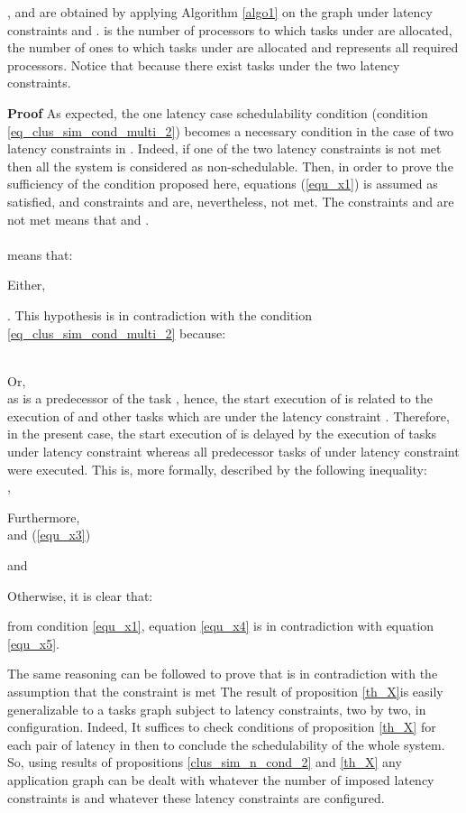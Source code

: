 \documentclass{ijcaArticle}
\begin{document}
,  and  are obtained by applying Algorithm \ref{algo1} on the graph under latency  constraints  and .  is the number of processors to which tasks under  are allocated,  the number of ones to which tasks under  are allocated and  represents all required processors. Notice that  because there exist tasks under the two latency constraints.    




\vskip2mm

\textbf{Proof} 
As expected, the one latency case schedulability condition (condition \ref{eq_clus_sim_cond_multi_2}) becomes a necessary condition in the case of two latency constraints in . Indeed, if one of the two latency constraints is not met then all the system is considered as non-schedulable.
Then, in order to prove the sufficiency of the condition proposed here, equations (\ref{equ_x1}) is assumed as satisfied, and constraints  and  are, nevertheless,  not met.  The constraints  and  are not met means that  and . 
\\\\
 means that: 


Either, 

. This hypothesis is in contradiction with the condition \ref{eq_clus_sim_cond_multi_2}  because:

     \\
\vskip1mm
Or, \\ as  is a predecessor of the task , hence, the start execution of  is related to the execution of  and other tasks which are under the latency constraint . Therefore,  in the present case, the start execution of  is delayed by the execution   
of tasks under latency constraint  whereas all predecessor tasks of  under latency constraint  were executed. This is, more formally, described by the following inequality: \\ 
, 



Furthermore,\\  and (\ref{equ_x3})   

 and

    

Otherwise, it is clear that:  

from condition \ref{equ_x1}, equation \ref{equ_x4} is in contradiction with equation \ref{equ_x5}.  

\vskip1mm 


\noindent The same reasoning can be followed to prove that  is in contradiction with the assumption that the
constraint  is met
\vskip2mm
The result of proposition \ref{th_X}is easily generalizable to a tasks graph subject to  latency constraints, two by two, in  configuration. Indeed, It suffices to
check  conditions of proposition \ref{th_X} for each pair of latency in  then to conclude the schedulability of the whole system.  So, using results of propositions \ref{clus_sim_n_cond_2} and \ref{th_X} any application graph can be dealt with whatever the number of imposed latency constraints is and whatever these latency constraints are configured.  
\end{document}
